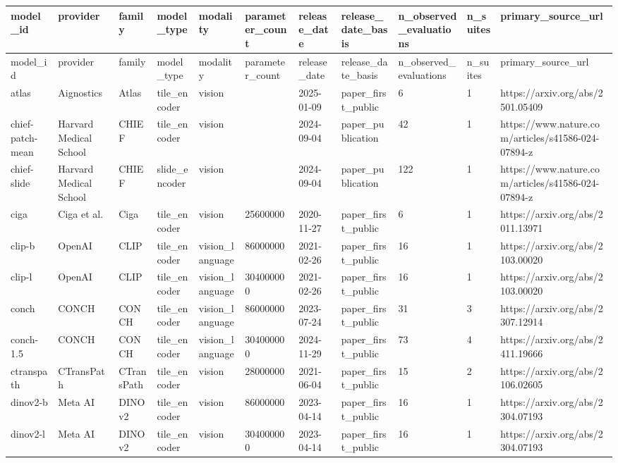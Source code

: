 \begin{longtable}{lllllllllll}
model\_id & provider & family & model\_type & modality & parameter\_count & release\_date & release\_date\_basis & n\_observed\_evaluations & n\_suites & primary\_source\_url \\
\hline
\endfirsthead
model\_id & provider & family & model\_type & modality & parameter\_count & release\_date & release\_date\_basis & n\_observed\_evaluations & n\_suites & primary\_source\_url \\
\hline
\endhead
atlas & Aignostics & Atlas & tile\_encoder & vision &  & 2025-01-09 & paper\_first\_public & 6 & 1 & https://arxiv.org/abs/2501.05409 \\
chief-patch-mean & Harvard Medical School & CHIEF & tile\_encoder & vision &  & 2024-09-04 & paper\_publication & 42 & 1 & https://www.nature.com/articles/s41586-024-07894-z \\
chief-slide & Harvard Medical School & CHIEF & slide\_encoder & vision &  & 2024-09-04 & paper\_publication & 122 & 1 & https://www.nature.com/articles/s41586-024-07894-z \\
ciga & Ciga et al. & Ciga & tile\_encoder & vision & 25600000 & 2020-11-27 & paper\_first\_public & 6 & 1 & https://arxiv.org/abs/2011.13971 \\
clip-b & OpenAI & CLIP & tile\_encoder & vision\_language & 86000000 & 2021-02-26 & paper\_first\_public & 16 & 1 & https://arxiv.org/abs/2103.00020 \\
clip-l & OpenAI & CLIP & tile\_encoder & vision\_language & 304000000 & 2021-02-26 & paper\_first\_public & 16 & 1 & https://arxiv.org/abs/2103.00020 \\
conch & CONCH & CONCH & tile\_encoder & vision\_language & 86000000 & 2023-07-24 & paper\_first\_public & 31 & 3 & https://arxiv.org/abs/2307.12914 \\
conch-1.5 & CONCH & CONCH & tile\_encoder & vision\_language & 304000000 & 2024-11-29 & paper\_first\_public & 73 & 4 & https://arxiv.org/abs/2411.19666 \\
ctranspath & CTransPath & CTransPath & tile\_encoder & vision & 28000000 & 2021-06-04 & paper\_first\_public & 15 & 2 & https://arxiv.org/abs/2106.02605 \\
dinov2-b & Meta AI & DINOv2 & tile\_encoder & vision & 86000000 & 2023-04-14 & paper\_first\_public & 16 & 1 & https://arxiv.org/abs/2304.07193 \\
dinov2-l & Meta AI & DINOv2 & tile\_encoder & vision & 304000000 & 2023-04-14 & paper\_first\_public & 16 & 1 & https://arxiv.org/abs/2304.07193 \\

\end{longtable}
